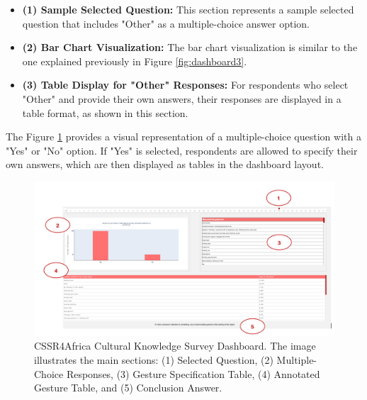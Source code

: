 \documentclass{CSSRforAfrica}
\begin{document}
\begin{itemize}
    \item \textbf{(1) Sample Selected Question:} This section represents a sample selected question that includes "Other" as a multiple-choice answer option.
    
    \item \textbf{(2) Bar Chart Visualization:} The bar chart visualization is similar to the one explained previously in Figure \ref{fig:dashboard3}.
    
    \item \textbf{(3) Table Display for "Other" Responses:} For respondents who select "Other" and provide their own answers, their responses are displayed in a table format, as shown in this section.
\end{itemize}
\newpage
\noindent The Figure \ref{fig:dashboard5} provides a visual representation of a multiple-choice question with a "Yes" or "No" option. If "Yes" is selected, respondents are allowed to specify their own answers, which are then displayed as tables in the dashboard layout.

\begin{figure}[H]
    \centering
    \includegraphics[width=\textwidth]{dashboard55.png} 
    \caption{CSSR4Africa Cultural Knowledge Survey Dashboard. The image illustrates the main sections: (1) Selected Question, (2) Multiple-Choice Responses, (3) Gesture Specification Table, (4) Annotated Gesture Table, and (5) Conclusion Answer.}
    \label{fig:dashboard5}
\end{figure}
\end{document}

